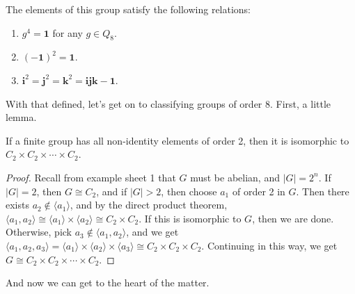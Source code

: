 \documentclass[a4]{scrreprt}
\begin{document}
The elements of this group satisfy the following relations:
\begin{enumerate}[label=(\roman*)]
	\item $g^4= \mathbf{1}$ for any $g \in Q_8$.
	\item $(-\mathbf{1})^2 = \mathbf{1}$.
	\item $\mathbf{i}^2 = \mathbf{j}^2 = \mathbf{k}^2 = \mathbf{ijk} -\mathbf{1}$.
\end{enumerate}

With that defined, let's get on to classifying groups of order 8.
First, a little lemma.

\begin{lemma}
	If a finite group has all non-identity elements of order 2, then it is isomorphic to $C_2 \times C_2 \times \cdots \times C_2$.
\end{lemma}
\begin{proof}
	Recall from example sheet 1 that $G$ must be abelian, and $|G| = 2^n$. If $|G| = 2$, then $G \cong C_2$, and if $|G| > 2$, then choose $a_1$ of order 2 in $G$. Then there exists $a_2 \not \in \langle a_1 \rangle$, and by the direct product theorem, $\langle a_1, a_2 \rangle \cong \langle a_1 \rangle \times \langle a_2 \rangle \cong C_2 \times C_2$.
	If this is isomorphic to $G$, then we are done. Otherwise, pick $a_3 \not \in \langle a_1, a_2 \rangle$, and we get $\langle a_1, a_2, a_3 \rangle = \langle a_1 \rangle \times \langle a_2 \rangle \times \langle a_3 \rangle \cong C_2 \times C_2 \times C_2$. Continuing in this way, we get $G \cong C_2 \times C_2 \times \cdots \times C_2$. 
\end{proof}

And now we can get to the heart of the matter.
\end{document}
